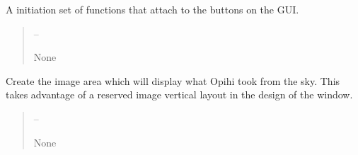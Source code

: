 \documentclass[letterpaper,11pt,english]{sphinxmanual}
\begin{document}
\begin{savenotes}
\begin{fulllineitems}
\begin{savenotes}\begin{fulllineitems}
\label{\detokenize{code/opihiexarata.gui.selector:opihiexarata.gui.selector.TargetSelectorWindow.__init_gui_connections}}
\pysigstartsignatures
{}
\pysigstopsignatures
\sphinxAtStartPar
A initiation set of functions that attach to the buttons on the
GUI.
\begin{quote}\begin{description}
\sphinxAtStartPar
{} – 

\sphinxAtStartPar
None

\end{description}\end{quote}

\end{fulllineitems}\end{savenotes}


\begin{savenotes}\begin{fulllineitems}
\label{\detokenize{code/opihiexarata.gui.selector:opihiexarata.gui.selector.TargetSelectorWindow.__init_opihi_image}}
\pysigstartsignatures
{}
\pysigstopsignatures
\sphinxAtStartPar
Create the image area which will display what Opihi took from the
sky. This takes advantage of a reserved image vertical layout in the
design of the window.
\begin{quote}\begin{description}
\sphinxAtStartPar
{} – 

\sphinxAtStartPar
None

\end{description}\end{quote}

\end{fulllineitems}\end{savenotes}



\end{fulllineitems}
\end{savenotes}
\end{document}
